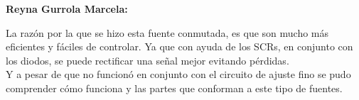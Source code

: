 \documentclass[letterpaper]{article}
\begin{document}
\textbf{Reyna Gurrola Marcela:\\}
\begin{large}
La razón por la que se hizo esta fuente conmutada, es que son mucho más eficientes y fáciles de controlar. Ya que con ayuda de los SCRs, en conjunto con los diodos, se puede rectificar una señal mejor evitando pérdidas.\\ Y a pesar de que no funcionó en conjunto con el circuito de ajuste fino se pudo comprender cómo funciona y las partes que conforman a este tipo de fuentes.\\\\
\end{large}
\end{document}
